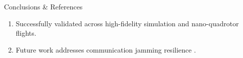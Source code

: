 \documentclass[aspectratio=169, 11pt]{beamer}
\begin{document}
\begin{frame}{Conclusions \& References}
    \begin{enumerate}
        \item Successfully validated across high-fidelity simulation and nano-quadrotor flights.
        \item Future work addresses communication jamming resilience \cite{ieee_evans}.
    \end{enumerate}

    \vspace{1em}
    
    
\end{frame}
\end{document}
